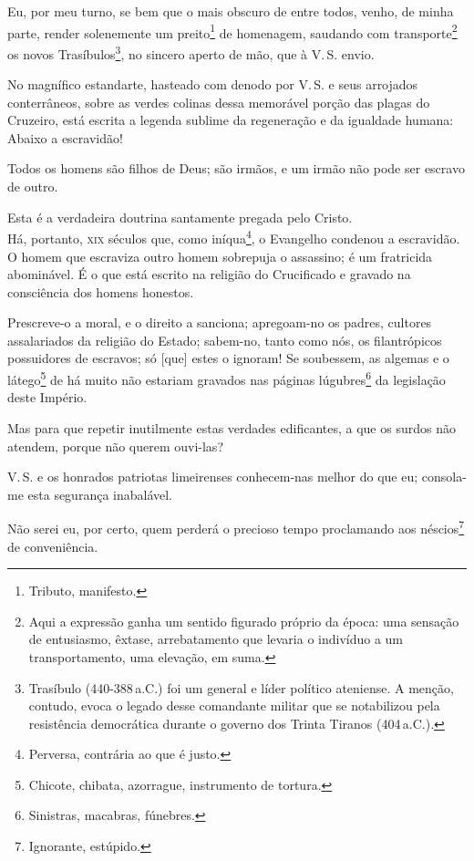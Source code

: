 Eu, por meu turno, se bem que o mais obscuro de entre todos, venho, de
minha parte, render solenemente um preito\footnote{Tributo, manifesto.}
de homenagem, saudando com transporte\footnote{Aqui a expressão ganha
  um sentido figurado próprio da época: uma sensação de entusiasmo,
  êxtase, arrebatamento que levaria o indivíduo a um transportamento,
  uma elevação, em suma.} os novos Trasíbulos\footnote{Trasíbulo
  (440-388\,a.C.) foi um general e líder político ateniense. A menção,
  contudo, evoca o legado desse comandante militar que se notabilizou
  pela resistência democrática durante o governo dos Trinta Tiranos (404\,a.C.).}, 
  no sincero aperto de mão, que à V.\,S. envio.

No magnífico estandarte, hasteado com denodo por V.\,S. e seus arrojados
conterrâneos, sobre as verdes colinas dessa memorável porção das plagas
do Cruzeiro, está escrita a legenda sublime da regeneração e da
igualdade humana: Abaixo a escravidão!

Todos os homens são filhos de Deus; são irmãos, e um irmão não pode ser
escravo de outro.

Esta é a verdadeira doutrina santamente pregada pelo Cristo.\\
Há, portanto, \textsc{xix} séculos que, como iníqua\footnote{Perversa,
  contrária ao que é justo.}, o Evangelho condenou a escravidão.\\
O homem que escraviza outro homem sobrepuja o assassino; é um fratricida
abominável. É o que está escrito na religião do Crucificado e gravado na
consciência dos homens honestos.

Prescreve-o a moral, e o direito a sanciona; apregoam-no os padres,
cultores assalariados da religião do Estado; sabem-no, tanto como nós,
os filantrópicos possuidores de escravos; só {[}que{]} estes o ignoram!
Se soubessem, as algemas e o látego\footnote{Chicote, chibata,
  azorrague, instrumento de tortura.} de há muito não estariam gravados
nas páginas lúgubres\footnote{Sinistras, macabras, fúnebres.} da
legislação deste Império.

Mas para que repetir inutilmente estas verdades edificantes, a que os
surdos não atendem, porque não querem ouvi-las?

V.\,S. e os honrados patriotas limeirenses conhecem-nas melhor do que eu;
consola-me esta segurança inabalável.

Não serei eu, por certo, quem perderá o precioso tempo proclamando aos
néscios\footnote{Ignorante, estúpido.} de conveniência.

